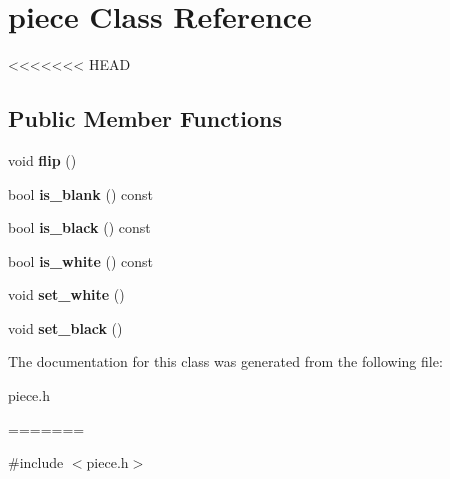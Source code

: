 \hypertarget{classpiece}{}\section{piece Class Reference}
\label{classpiece}
<<<<<<< HEAD
\subsection*{Public Member Functions}
\begin{DoxyCompactItemize}
\item 
void {\bfseries flip} ()\hypertarget{classpiece_ab898c5827a5859e4cddc9d61a814a873}{}\label{classpiece_ab898c5827a5859e4cddc9d61a814a873}

\item 
bool {\bfseries is\+\_\+blank} () const \hypertarget{classpiece_af8e5afd9e1eb6b367c7da643c94c7113}{}\label{classpiece_af8e5afd9e1eb6b367c7da643c94c7113}

\item 
bool {\bfseries is\+\_\+black} () const \hypertarget{classpiece_abb229bd7452561f1f3aa794e5561aa60}{}\label{classpiece_abb229bd7452561f1f3aa794e5561aa60}

\item 
bool {\bfseries is\+\_\+white} () const \hypertarget{classpiece_a229a0c4b29e449350b2c3ba019e6c9a9}{}\label{classpiece_a229a0c4b29e449350b2c3ba019e6c9a9}

\item 
void {\bfseries set\+\_\+white} ()\hypertarget{classpiece_a31480899f2a591fdb22d97933303e19d}{}\label{classpiece_a31480899f2a591fdb22d97933303e19d}

\item 
void {\bfseries set\+\_\+black} ()\hypertarget{classpiece_a273d63d07b6ea973b2fc4f7e1b56ea10}{}\label{classpiece_a273d63d07b6ea973b2fc4f7e1b56ea10}

\end{DoxyCompactItemize}


The documentation for this class was generated from the following file\+:\begin{DoxyCompactItemize}
\item 
piece.\+h\end{DoxyCompactItemize}
=======


{\ttfamily \#include $<$piece.\+h$>$}


